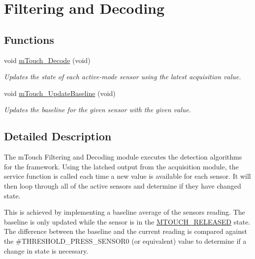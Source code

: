 \hypertarget{group___decoding}{}\section{Filtering and Decoding}
\label{group___decoding}
\subsection*{Functions}
\begin{DoxyCompactItemize}
\item 
void \hyperlink{group___decoding_ga8955adf440115510aace00d81444e268}{m\+Touch\+\_\+\+Decode} (void)
\begin{DoxyCompactList}\small\item\em Updates the state of each active-\/mode sensor using the latest acquisition value. \end{DoxyCompactList}\item 
void \hyperlink{group___decoding_gad860d35191988afa8f9d02bcb946c08b}{m\+Touch\+\_\+\+Update\+Baseline} (void)
\begin{DoxyCompactList}\small\item\em Updates the baseline for the given sensor with the given value. \end{DoxyCompactList}\end{DoxyCompactItemize}


\subsection{Detailed Description}
The m\+Touch Filtering and Decoding module executes the detection algorithms for the framework. Using the latched output from the acquisition module, the service function is called each time a new value is available for each sensor. It will then loop through all of the active sensors and determine if they have changed state.

This is achieved by implementing a baseline average of the sensor\textquotesingle{}s reading. The baseline is only updated while the sensor is in the \hyperlink{m_touch_cap_2_p_i_c12_f_01_p_i_c16_f_01_library_2m_touch_8h_a7d72b112c35bc51408030eb7ecdcacd2a9171b63f68c2e5ed308f9700e824cbbe}{M\+T\+O\+U\+C\+H\+\_\+\+R\+E\+L\+E\+A\+S\+E\+D} state. The difference between the baseline and the current reading is compared against the \#\+T\+H\+R\+E\+S\+H\+O\+L\+D\+\_\+\+P\+R\+E\+S\+S\+\_\+\+S\+E\+N\+S\+O\+R0 (or equivalent) value to determine if a change in state is necessary.


